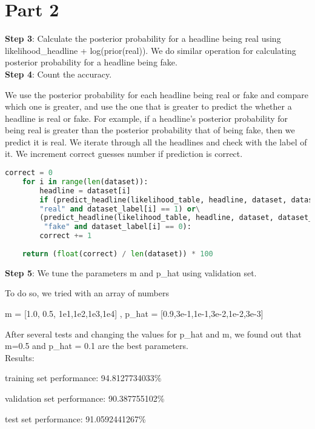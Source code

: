 \documentclass{article}
\newcommand{\enterProblemHeader}[1]{
}
\newcommand{\exitProblemHeader}[1]{
}
\newcounter{homeworkProblemCounter} %
\newcommand{\homeworkProblemName}{}
\newenvironment{homeworkProblem}[1][Problem \arabic{homeworkProblemCounter}]{ %
	\stepcounter{homeworkProblemCounter} %
	\renewcommand{\homeworkProblemName}{#1} %
	\section{\homeworkProblemName} %
	\enterProblemHeader{\homeworkProblemName} %
}{
	\exitProblemHeader{\homeworkProblemName} %
}
\begin{document}
\begin{homeworkProblem}[Part 2]
		\textbf{Step 3}: Calculate the posterior probability for a headline being real using likelihood\_headline + log(prior(real)). We do similar operation for calculating posterior probability for a headline being fake. \\
		
		\textbf{Step 4}: Count the accuracy. 
		
		We use the posterior probability for each headline being real or fake and compare which one is greater, and use the one that is greater to predict the whether a headline is real or fake. For example, if a headline's posterior probability for being real is greater than the posterior probability that of being fake, then we predict it is real. We iterate through all the headlines and check with the label of it. We increment correct guesses number if prediction is correct. \\
\begin{lstlisting}[language=Python, caption=Calculate performance for a dataset]	
	correct = 0
	for i in range(len(dataset)):
		headline = dataset[i]
		if (predict_headline(likelihood_table, headline, dataset, dataset_label) == 
		"real" and dataset_label[i] == 1) or\
		(predict_headline(likelihood_table, headline, dataset, dataset_label) ==
		 "fake" and dataset_label[i] == 0):
		correct += 1
	
	return (float(correct) / len(dataset)) * 100
\end{lstlisting}
		\textbf{Step 5}: We tune the parameters m and p\_hat using validation set. 
		
		To do so, we tried with an array of numbers 
		
		m = [1.0, 0.5, 1e1,1e2,1e3,1e4] ,	p\_hat = [0.9,3e-1,1e-1,3e-2,1e-2,3e-3]
		
		After several tests and changing the values for p\_hat and m, we found out that m=0.5 and p\_hat = 0.1 are the best parameters. \\
		
		Results:
		
		training set performance: 94.8127734033\%
		
		validation set performance: 90.387755102\%
		
		test set performance: 91.0592441267\%

		
	\end{homeworkProblem}
	\clearpage
	
\end{document}
